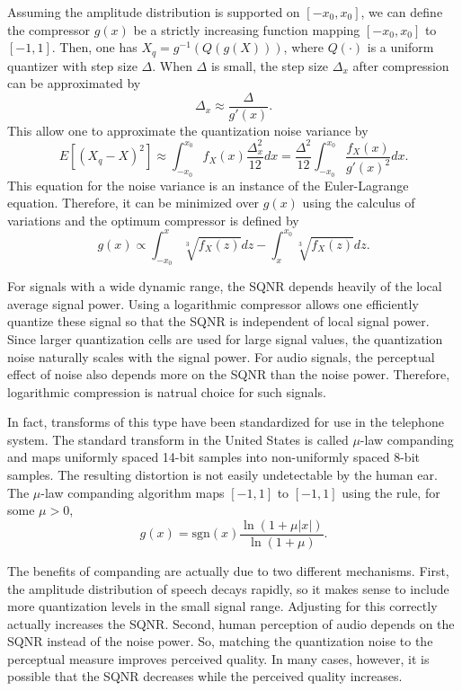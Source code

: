 Assuming the amplitude distribution is supported on $[-x_0 , x_0 ]$, we can define the compressor $g(x)$ be a strictly increasing function mapping $[ -x_0 , x_0 ]$ to $[ -1 , 1 ]$.
Then, one has $X_q = g^{-1} \left( Q \left( g(X) \right) \right)$, where $Q(\cdot)$ is a uniform quantizer with step size $\Delta$.
When $\Delta$ is small, the step size $\Delta_x$ after compression can be approximated by
\[ \Delta_x \approx \frac{\Delta}{g'(x)}. \]
This allow one to approximate the quantization noise variance by
\[ E \left[ (X_q - X)^2 \right] \approx \int_{-x_0}^{x_0} f_X (x) \frac{\Delta_x^2}{12} dx = \frac{\Delta^2}{12} \int_{-x_0}^{x_0} \frac{f_X (x)}{g'(x)^2} dx. \]
This equation for the noise variance is an instance of the Euler-Lagrange equation.
Therefore, it can be minimized over $g(x)$ using the calculus of variations and the optimum compressor is defined by
\[ g(x) \propto \int_{-x_0}^{x} \sqrt[3]{f_X (z)} dz - \int_{x}^{x_0} \sqrt[3]{f_X (z)} dz . \]

For signals with a wide dynamic range, the SQNR depends heavily of the local average signal power.
Using a logarithmic compressor allows one efficiently quantize these signal so that the SQNR is independent of local signal power.
Since larger quantization cells are used for large signal values, the quantization noise naturally scales with the signal power.
For audio signals, the perceptual effect of noise also depends more on the SQNR than the noise power.
Therefore, logarithmic compression is natrual choice for such signals.

In fact, transforms of this type have been standardized for use in the telephone system.
The standard transform in the United States is called $\mu$-law companding and maps uniformly spaced 14-bit samples into non-uniformly spaced 8-bit samples.
The resulting distortion is not easily undetectable by the human ear.
The $\mu$-law companding algorithm maps $[-1,1]$ to $[-1,1]$ using the rule, for some $\mu >0$,
\[ g(x) = \mathrm{sgn}(x)\frac{\ln \left( 1+ \mu |x| \right)}{\ln (1+\mu)}. \]

The benefits of companding are actually due to two different mechanisms.
First, the amplitude distribution of speech decays rapidly, so it makes sense to include more quantization levels in the small signal range.
Adjusting for this correctly actually increases the SQNR.
Second, human perception of audio depends on the SQNR instead of the noise power.
So, matching the quantization noise to the perceptual measure improves perceived quality.
In many cases, however, it is possible that the SQNR decreases while the perceived quality increases.

